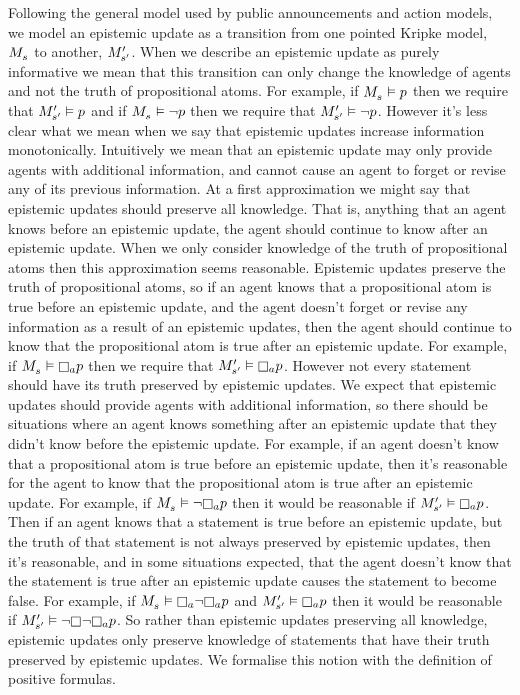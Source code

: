 Following the general model used by public announcements and action models, we model an epistemic update as a transition from one pointed Kripke model, $\kPModel{\kStateS}$ to another, ${M^{\prime}_{{s}^{\prime}}}$.
When we describe an epistemic update as purely informative we mean that this transition can only change the knowledge of agents and not the truth of propositional atoms.
For example, if $\kPModel{\kStateS} \entails \atomP$ then we require that ${M^{\prime}_{{s}^{\prime}}} \vDash p$ and if $\kPModel{\kStateS} \entails \lnot \atomP$ then we require that ${M^{\prime}_{{s}^{\prime}}} \vDash \lnot p$.
However it's less clear what we mean when we say that epistemic updates increase information monotonically.
Intuitively we mean that an epistemic update may only provide agents with additional information, and cannot cause an agent to forget or revise any of its previous information.
At a first approximation we might say that epistemic updates should preserve all knowledge.
That is, anything that an agent knows before an epistemic update, the agent should continue to know after an epistemic update.
When we only consider knowledge of the truth of propositional atoms then this approximation seems reasonable.
Epistemic updates preserve the truth of propositional atoms, so if an agent knows that a propositional atom is true before an epistemic update, and the agent doesn't forget or revise any information as a result of an epistemic updates, then the agent should continue to know that the propositional atom is true after an epistemic update.
For example, if $\kPModel{\kStateS} \entails \knowsA \atomP$ then we require that $\kPModelP{\kStateSP} \entails \knowsA \atomP$.
However not every statement should have its truth preserved by epistemic updates.
We expect that epistemic updates should provide agents with additional information, so there should be situations where an agent knows something after an epistemic update that they didn't know before the epistemic update.
For example, if an agent doesn't know that a propositional atom is true before an epistemic update, then it's reasonable for the agent to know that the propositional atom is true after an epistemic update.
For example, if $\kPModel{\kStateS} \entails \lnot \knowsA \atomP$ then it would be reasonable if $\kPModelP{\kStateSP} \entails \knowsA \atomP$.
Then if an agent knows that a statement is true before an epistemic update, but the truth of that statement is not always preserved by epistemic updates, then it's reasonable, and in some situations expected, that the agent doesn't know that the statement is true after an epistemic update causes the statement to become false.
For example, if $\kPModel{\kStateS} \entails \knowsA \lnot \knowsA \atomP$ and $\kPModelP{\kStateSP} \entails \knowsA \atomP$ then it would be reasonable if $\kPModelP{\kStateSP} \entails \lnot \knows \lnot \knowsA \atomP$.
So rather than epistemic updates preserving all knowledge, epistemic updates only preserve knowledge of statements that have their truth preserved by epistemic updates.
We formalise this notion with the definition of positive formulas.

